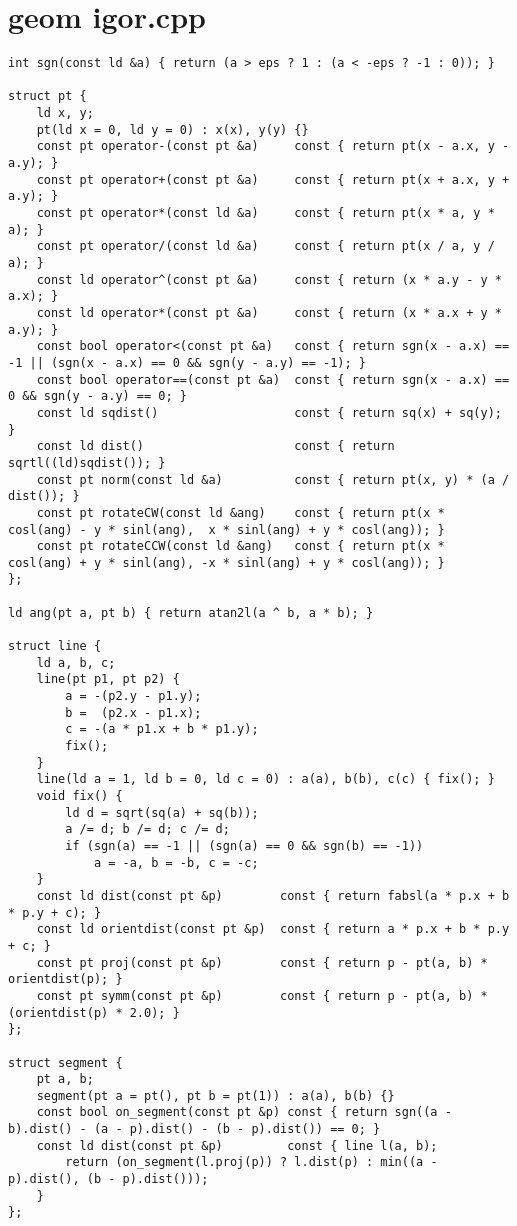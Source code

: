\documentclass[a4paper,12pt]{report}
\begin{document}
\section{geom igor.cpp}
\begin{lstlisting}
int sgn(const ld &a) { return (a > eps ? 1 : (a < -eps ? -1 : 0)); }

struct pt {
    ld x, y;
    pt(ld x = 0, ld y = 0) : x(x), y(y) {}
    const pt operator-(const pt &a)     const { return pt(x - a.x, y - a.y); }
    const pt operator+(const pt &a)     const { return pt(x + a.x, y + a.y); }
    const pt operator*(const ld &a)     const { return pt(x * a, y * a); }
    const pt operator/(const ld &a)     const { return pt(x / a, y / a); }
    const ld operator^(const pt &a)     const { return (x * a.y - y * a.x); }
    const ld operator*(const pt &a)     const { return (x * a.x + y * a.y); }
    const bool operator<(const pt &a)   const { return sgn(x - a.x) == -1 || (sgn(x - a.x) == 0 && sgn(y - a.y) == -1); }
    const bool operator==(const pt &a)  const { return sgn(x - a.x) == 0 && sgn(y - a.y) == 0; }
    const ld sqdist()                   const { return sq(x) + sq(y); }
    const ld dist()                     const { return sqrtl((ld)sqdist()); }
    const pt norm(const ld &a)          const { return pt(x, y) * (a / dist()); }
    const pt rotateCW(const ld &ang)    const { return pt(x * cosl(ang) - y * sinl(ang),  x * sinl(ang) + y * cosl(ang)); }
    const pt rotateCCW(const ld &ang)   const { return pt(x * cosl(ang) + y * sinl(ang), -x * sinl(ang) + y * cosl(ang)); }
};

ld ang(pt a, pt b) { return atan2l(a ^ b, a * b); }

struct line {
    ld a, b, c;
    line(pt p1, pt p2) {
        a = -(p2.y - p1.y);
        b =  (p2.x - p1.x);
        c = -(a * p1.x + b * p1.y);
        fix();
    }
    line(ld a = 1, ld b = 0, ld c = 0) : a(a), b(b), c(c) { fix(); }
    void fix() {
        ld d = sqrt(sq(a) + sq(b));
        a /= d; b /= d; c /= d;
        if (sgn(a) == -1 || (sgn(a) == 0 && sgn(b) == -1))
            a = -a, b = -b, c = -c;
    }
    const ld dist(const pt &p)        const { return fabsl(a * p.x + b * p.y + c); }
    const ld orientdist(const pt &p)  const { return a * p.x + b * p.y + c; }
    const pt proj(const pt &p)        const { return p - pt(a, b) * orientdist(p); }
    const pt symm(const pt &p)        const { return p - pt(a, b) * (orientdist(p) * 2.0); }
};

struct segment {
    pt a, b;
    segment(pt a = pt(), pt b = pt(1)) : a(a), b(b) {}
    const bool on_segment(const pt &p) const { return sgn((a - b).dist() - (a - p).dist() - (b - p).dist()) == 0; }
    const ld dist(const pt &p)         const { line l(a, b);
        return (on_segment(l.proj(p)) ? l.dist(p) : min((a - p).dist(), (b - p).dist()));
    }
};


\end{lstlisting}
\end{document}

